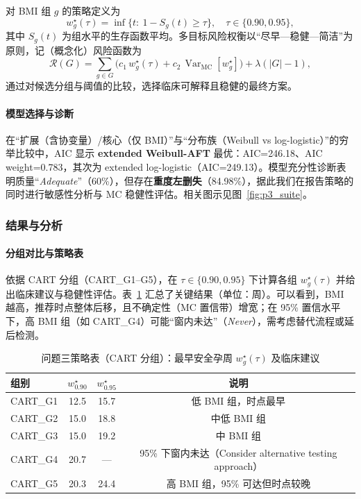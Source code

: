 \documentclass[withoutpreface]{cumcmthesis}
\begin{document}
对 BMI 组 $g$ 的策略定义为
\[
w^{\star}_g(\tau)=\inf\{t:\ 1-S_g(t)\ge \tau\},\quad \tau\in\{0.90,0.95\},
\]
其中 $S_g(t)$ 为组水平的生存函数平均。多目标风险权衡以“尽早—稳健—简洁”为原则，记（概念化）风险函数为
\[
\mathcal R(G)=\sum_{g\in G}\Big(c_1\,w^{\star}_g(\tau)+c_2\,\operatorname{Var}_\text{MC}[w^{\star}_g]\Big)+\lambda(|G|-1),
\]
通过对候选分组与阈值的比较，选择临床可解释且稳健的最终方案。

\paragraph{模型选择与诊断} 在“扩展（含协变量）/核心（仅 BMI）”与“分布族（Weibull vs log-logistic）”的穷举比较中，AIC 显示 \textbf{extended Weibull-AFT} 最优：AIC=\num{246.18}、AIC weight=\num{0.783}，其次为 extended log-logistic（AIC=\num{249.13}）。模型充分性诊断表明质量“\textit{Adequate}”（60\%），但存在\textbf{重度左删失}（\num{84.98}\%），据此我们在报告策略的同时进行敏感性分析与 MC 稳健性评估。相关图示见图~\ref{fig:p3_suite}。

\subsubsection{结果与分析}
\paragraph{分组对比与策略表} 依据 CART 分组（CART\_G1–G5），在 $\tau\in\{0.90,0.95\}$ 下计算各组 $w^{\star}_g(\tau)$ 并给出临床建议与稳健性评估。表~\ref{tab:p3_policy} 汇总了关键结果（单位：周）。可以看到，BMI 越高，推荐时点整体后移，且不确定性（MC 置信带）增宽；在 95\% 置信水平下，高 BMI 组（如 CART\_G4）可能“窗内未达”（\emph{Never}），需考虑替代流程或延后检测。

\begin{table}[htbp]
  \centering
  \caption{问题三策略表（CART 分组）：最早安全孕周 $w^{\star}_g(\tau)$ 及临床建议}
  \label{tab:p3_policy}
  \begin{tabular}{@{}lccc@{}}
    \toprule
    组别 & $w^{\star}_{0.90}$ & $w^{\star}_{0.95}$ & 说明 \\
    \midrule
    CART\_G1 & 12.5 & 15.7 & 低 BMI 组，时点最早 \\
    CART\_G2 & 15.0 & 18.8 & 中低 BMI 组 \\
    CART\_G3 & 15.0 & 19.2 & 中 BMI 组 \\
    CART\_G4 & 20.7 & — & 95\% 下窗内未达（Consider alternative testing approach） \\
    CART\_G5 & 20.3 & 24.4 & 高 BMI 组，95\% 可达但时点较晚 \\
    \bottomrule
  \end{tabular}
\end{table}
\end{document}
